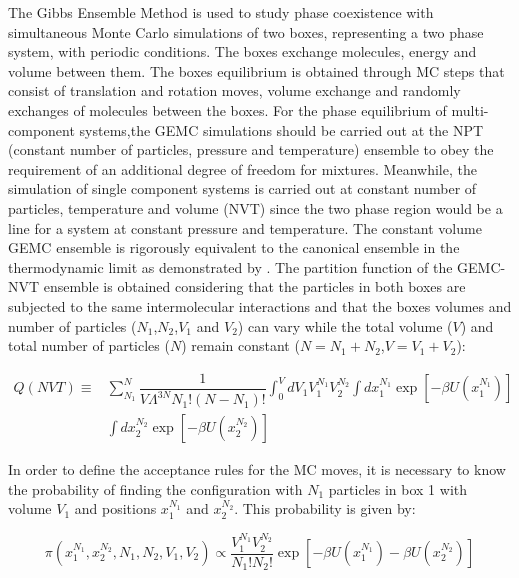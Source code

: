 The Gibbs Ensemble Method \cite{papa1987} is used to study phase coexistence with simultaneous Monte Carlo simulations of two boxes,  representing a two phase system, with periodic conditions. The boxes exchange molecules, energy and volume between them. The boxes equilibrium is obtained through MC steps that consist of translation and rotation moves, volume exchange and randomly exchanges of molecules between the boxes. For the phase equilibrium of multi-component systems,the GEMC simulations should be carried out at the NPT (constant number of particles, pressure and temperature) ensemble to obey the requirement of an additional degree of freedom for mixtures. Meanwhile, the simulation of single component systems is carried out at constant number of particles, temperature and volume (NVT) since the two phase region would be a line for a system at constant pressure and temperature. The constant volume GEMC ensemble is rigorously equivalent to the canonical ensemble in the thermodynamic limit as demonstrated by . The partition function of the GEMC-NVT ensemble is obtained considering that the particles in both boxes are subjected to the same intermolecular interactions and that the boxes volumes and number of particles ($N_{1}$,$N_{2}$,$V_{1}$ and $V_{2}$) can vary while the total volume ($V$) and total number of particles ($N$) remain constant ($N = N_{1} + N_{2}$,$V = V_{1} + V_{2}$):

\begin{equation}
\begin{aligned}
Q(NVT) {} \equiv & \sum_{N_{1}}^{N} \dfrac{1}{V \Lambda ^{3N} N_{1}!(N-N_{1})!} \int_{0}^{V} dV_{1} V_{1}^{N_{1}} V_{2}^{N_{2}} \int dx_{1}^{N_{1}} \exp[-\beta U(x_{1}^{N_{1}})] \\
& \int dx_{2}^{N_{2}} \exp[-\beta U(x_{2}^{N_{2}})]
\end{aligned}
\label{eqn:gepart}
\end{equation}

In order to define the acceptance rules for the MC moves, it is necessary to know the probability of finding the configuration with $N_{1}$ particles in box 1 with volume $V_{1}$ and positions $x_{1}^{N_{1}}$ and $x_{2}^{N_{2}}$. This probability is given by:

\begin{equation}
\pi(x_{1}^{N_{1}},x_{2}^{N_{2}},N_{1},N_{2},V_{1},V_{2}) \propto \dfrac{V_{1}^{N_{1}}V_{2}^{N_{2}}}{N_{1}!N_{2}!} \exp[-\beta U(x_{1}^{N_{1}}) -\beta U(x_{2}^{N_{2}})]
\label{eqn:geprob}
\end{equation}

